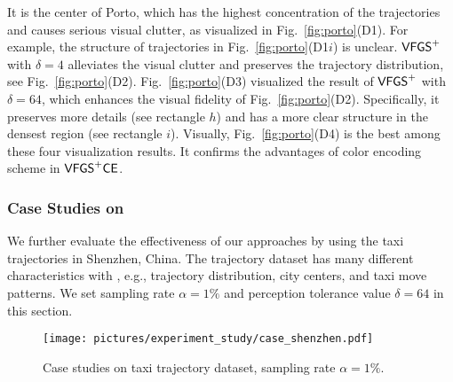 { It is the center of Porto, which has the highest concentration of the trajectories and causes serious visual clutter, as visualized in Fig.~\ref{fig:porto}(D1).
For example, the structure of trajectories in Fig.~\ref{fig:porto}(D1$i$) is unclear.
$\mathsf{VFGS}^{+}$ with $\delta=4$ alleviates the visual clutter and preserves the trajectory distribution, see Fig.~\ref{fig:porto}(D2).
Fig.~\ref{fig:porto}(D3) visualized the result of $\mathsf{VFGS}^{+}$ with $\delta=64$, which enhances the visual fidelity of Fig.~\ref{fig:porto}(D2).
Specifically, it preserves more details (see rectangle $h$) and has a more clear structure in the {densest} region (see rectangle $i$).
Visually, Fig.~\ref{fig:porto}(D4) is the best among these four visualization results.
It confirms the advantages of color encoding scheme in $\mathsf{VFGS}^{+}\mathsf{CE}$.



\vspace{-2mm}

\subsubsection{Case Studies on \sz}\label{sec:sz}
We further evaluate the effectiveness of our approaches by using the taxi trajectories in Shenzhen, China.
The \sz{} trajectory dataset has many different characteristics with \pt{}, e.g., trajectory distribution, city centers, and taxi move patterns.
We set sampling rate $\alpha=1\%$ and perception tolerance value $\delta = 64$ in this section.

\begin{figure*}[t]
	\centering
	\texttt{[image: pictures/experiment\_study/case\_shenzhen.pdf]}
	\vspace{-4mm}
	\caption{Case studies on \sz{} taxi trajectory dataset, sampling rate $\alpha = 1\%$.}
	\label{fig:shenzhen}
	\vspace{-3mm}
\end{figure*}

}
